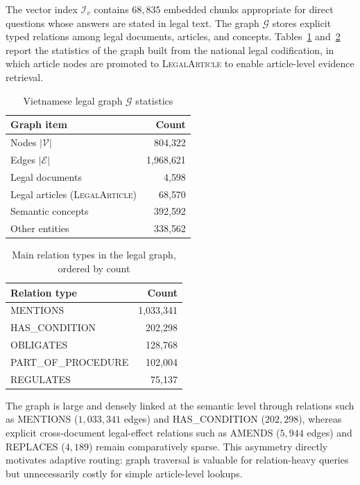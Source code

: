 \documentclass[pdflatex,sn-mathphys-num]{sn-jnl}
\begin{document}
The vector index $\mathcal{I}_v$ contains $68{,}835$ embedded chunks
appropriate for direct questions whose answers are stated in legal text. The
graph $\mathcal{G}$ stores explicit typed relations among legal documents,
articles, and concepts. Tables~\ref{tab:graph_stats}
and~\ref{tab:graph_relations} report the statistics of the graph built from
the national legal codification, in which article nodes are promoted to
\textsc{LegalArticle} to enable article-level evidence retrieval.

\begin{table}[!htbp]
\centering
\caption{Vietnamese legal graph $\mathcal{G}$ statistics}\label{tab:graph_stats}
\begin{tabular}{lr}
\toprule
\textbf{Graph item} & \textbf{Count} \\
\midrule
Nodes $|\mathcal{V}|$ & 804{,}322 \\
Edges $|\mathcal{E}|$ & 1{,}968{,}621 \\
Legal documents & 4{,}598 \\
Legal articles (\textsc{LegalArticle}) & 68{,}570 \\
Semantic concepts & 392{,}592 \\
Other entities & 338{,}562 \\
\bottomrule
\end{tabular}
\end{table}

\begin{table}[!htbp]
\centering
\caption{Main relation types in the legal graph, ordered by count}\label{tab:graph_relations}
\begin{tabular}{lr}
\toprule
\textbf{Relation type} & \textbf{Count} \\
\midrule
\textsc{MENTIONS} & 1{,}033{,}341 \\
\textsc{HAS\_CONDITION} & 202{,}298 \\
\textsc{OBLIGATES} & 128{,}768 \\
\textsc{PART\_OF\_PROCEDURE} & 102{,}004 \\
\textsc{REGULATES} & 75{,}137 \\
\bottomrule
\end{tabular}
\end{table}

The graph is large and densely linked at the semantic level through relations
such as \textsc{MENTIONS} ($1{,}033{,}341$ edges) and \textsc{HAS\_CONDITION}
($202{,}298$), whereas explicit cross-document legal-effect relations such as
\textsc{AMENDS} ($5{,}944$ edges) and \textsc{REPLACES} ($4{,}189$) remain
comparatively sparse. This asymmetry directly motivates adaptive routing:
graph traversal is valuable for relation-heavy queries but unnecessarily
costly for simple article-level lookups.
\end{document}
